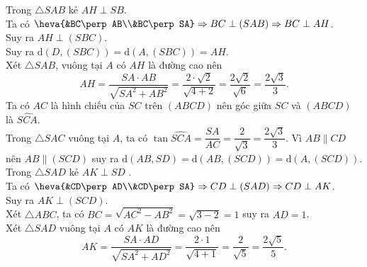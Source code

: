 \begin{ex}
{\begin{itemchoice}
			Trong $\triangle SAB$ kẻ $AH \perp SB$.\\ 
			Ta có $\heva{&BC\perp AB\\&BC\perp SA}\Rightarrow BC\perp (SAB)\Rightarrow BC\perp AH$.\\
			Suy ra $AH\perp(SBC)$.\\
			Suy ra $\mathrm{d}(D,(SBC)) = \mathrm{d}(A,(SBC))=AH$.\\
			Xét $\triangle SAB$, vuông tại $A$ có $AH$ là đường cao nên
			$$AH = \dfrac{SA \cdot AB}{\sqrt{SA^2 + AB^2}} = \dfrac{2 \cdot \sqrt{2}}{\sqrt{4 + 2}} = \dfrac{2\sqrt{2}}{\sqrt{6}} = \dfrac{2\sqrt{3}}{3}.$$
			\itemch 
			Ta có $AC$ là hình chiếu của $SC$ trên $(ABCD)$ nên góc giữa $SC$ và $(ABCD)$ là $\widehat{SCA} $.\\
			Trong $\triangle SAC$ vuông tại $A$, ta có $\tan \widehat{SCA} = \dfrac{SA}{AC} = \dfrac{2}{\sqrt{3}} = \dfrac{2\sqrt{3}}{3}$.
			\itemch 
			Vì $AB \parallel CD$ nên $AB \parallel (SCD)$ suy ra $\mathrm{d}(AB, SD) = \mathrm{d}(AB, (SCD)) = \mathrm{d}(A, (SCD))$.\\
			Trong $\triangle SAD$ kẻ $AK \perp SD$ .\\
			Ta có $\heva{&CD\perp AD\\&CD\perp SA}\Rightarrow CD\perp(SAD)\Rightarrow CD\perp AK$.\\
			Suy ra $AK\perp(SCD)$.\\
			Xét $\triangle ABC$, 
			ta có $BC = \sqrt{AC^2 - AB^2} = \sqrt{3 - 2} = 1$ suy ra $AD = 1$.\\
			Xét $\triangle SAD$ vuông tại $A$ có $AK$ là đường cao nên $$AK = \dfrac{SA \cdot AD}{\sqrt{SA^2 + AD^2}} = \dfrac{2 \cdot 1}{\sqrt{4 + 1}} = \dfrac{2}{\sqrt{5}} = \dfrac{2\sqrt{5}}{5}.$$
		\end{itemchoice}
	}
\end{ex}

